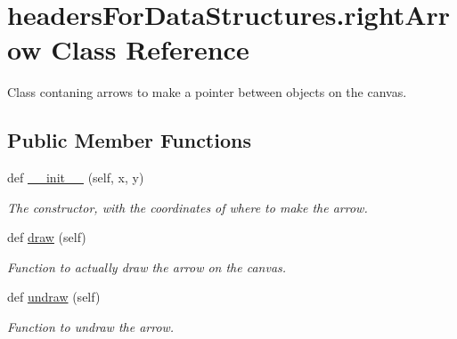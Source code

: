 \hypertarget{classheaders_for_data_structures_1_1right_arrow}{}\section{headers\+For\+Data\+Structures.\+right\+Arrow Class Reference}
\label{classheaders_for_data_structures_1_1right_arrow}


Class contaning arrows to make a pointer between objects on the canvas.  


\subsection*{Public Member Functions}
\begin{DoxyCompactItemize}
\item 
\mbox{\label{classheaders_for_data_structures_1_1right_arrow_a0d53d254a151ec5db5331c8a6afd36c0}} 
def \hyperlink{classheaders_for_data_structures_1_1right_arrow_a0d53d254a151ec5db5331c8a6afd36c0}{\+\_\+\+\_\+init\+\_\+\+\_\+} (self, x, y)
\begin{DoxyCompactList}\small\item\em The constructor, with the coordinates of where to make the arrow. \end{DoxyCompactList}\item 
\mbox{\label{classheaders_for_data_structures_1_1right_arrow_a0ab3e6bded6c7acb0c4dc9ba61d7ac31}} 
def \hyperlink{classheaders_for_data_structures_1_1right_arrow_a0ab3e6bded6c7acb0c4dc9ba61d7ac31}{draw} (self)
\begin{DoxyCompactList}\small\item\em Function to actually draw the arrow on the canvas. \end{DoxyCompactList}\item 
\mbox{\label{classheaders_for_data_structures_1_1right_arrow_a0a5c65179b5c92ce3d79d6f1c1678b5b}} 
def \hyperlink{classheaders_for_data_structures_1_1right_arrow_a0a5c65179b5c92ce3d79d6f1c1678b5b}{undraw} (self)
\begin{DoxyCompactList}\small\item\em Function to undraw the arrow. \end{DoxyCompactList}\item 

\end{DoxyCompactItemize}

